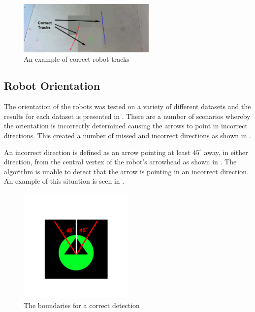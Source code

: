 \documentclass{article}
\begin{document}

\begin{figure}[h!]
	\centering
		\includegraphics[width=0.6\textwidth]{../Drawings/correctTracksData8.pdf}
	\caption{An example of correct robot tracks}
	\label{fig:tracks}
\end{figure}


\subsection{Robot Orientation}
\label{sec:orient}
The orientation of the robots was tested on a variety of different datasets and the results for each dataset is presented in . There are a number of scenarios whereby the orientation is incorrectly determined causing the arrows to point in incorrect directions. This created a number of missed and incorrect directions as shown in .

An incorrect direction is defined as an arrow pointing at least $45^{\circ}$ away, in either direction, from the central vertex of the robot's arrowhead as shown in . The  algorithm is unable to detect that the arrow is pointing in an incorrect direction. An example of this situation is seen in .


\begin{figure}[h!]
	\centering
		\includegraphics[width=0.5\textwidth]{../Drawings/arrowdegreevariation.pdf}
	\caption{The boundaries for a correct detection}
	\label{fig:arrowdef}
\end{figure}
\end{document}
